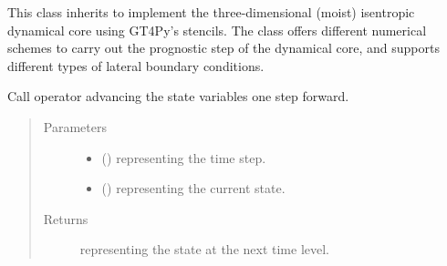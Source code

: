 \documentclass[letterpaper,10pt,english]{sphinxmanual}
\begin{document}

\begin{fulllineitems}
\label{\detokenize{api:dycore.dycore_isentropic.DynamicalCoreIsentropic}}
This class inherits {\hyperref[\detokenize{api:dycore.dycore.DynamicalCore}]{}} to implement the three-dimensional
(moist) isentropic dynamical core using GT4Py’s stencils. The class offers different numerical
schemes to carry out the prognostic step of the dynamical core, and supports different types of
lateral boundary conditions.

\begin{fulllineitems}
\label{\detokenize{api:dycore.dycore_isentropic.DynamicalCoreIsentropic.__call__}}
Call operator advancing the state variables one step forward.
\begin{quote}\begin{description}
\item[{Parameters}] \leavevmode\begin{itemize}
\item {} 
 () \textendash{}  representing the time step.

\item {} 
 () \textendash{} {\hyperref[\detokenize{api:storages.state_isentropic.StateIsentropic}]{}} representing the current state.

\end{itemize}

\item[{Returns}] \leavevmode
{\hyperref[\detokenize{api:storages.state_isentropic.StateIsentropic}]{}} representing the state at the next time level.


\end{description}
\end{quote}
\end{fulllineitems}
\end{fulllineitems}
\end{document}
